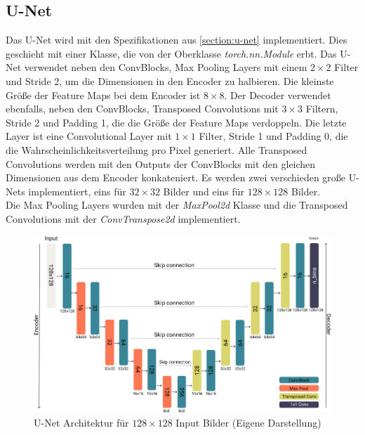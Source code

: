 \subsection{U-Net}
Das U-Net wird mit den Spezifikationen aus \ref{section:u-net} implementiert. Dies geschieht mit einer Klasse, die von der Oberklasse
\textit{torch.nn.Module} erbt. Das U-Net verwendet neben den ConvBlocks, Max Pooling Layers mit einem $2 \times 2$ Filter und Stride 2,
um die Dimensionen in den Encoder zu halbieren. Die kleinste Größe der Feature Maps bei dem Encoder ist $8 \times 8$.
Der Decoder verwendet ebenfalls, neben den ConvBlocks, Transposed Convolutions mit $3 \times 3$
Filtern, Stride 2 und Padding 1, die die Größe der Feature Maps verdoppeln. Die letzte Layer ist eine Convolutional Layer mit $1 \times 1$ Filter,
Stride 1 und Padding 0, die die
Wahrscheinlichkeitsverteilung pro Pixel generiert. Alle Transposed Convolutions werden mit den Outputs der ConvBlocks mit den gleichen
Dimensionen aus dem Encoder konkateniert.
Es werden zwei verschieden große U-Nets implementiert, eins für $32 \times 32$ Bilder und eins für
$128 \times 128$ Bilder.
\\
Die Max Pooling Layers wurden mit der \textit{MaxPool2d} Klasse und die Transposed Convolutions mit der \textit{ConvTranspose2d} implementiert.

\begin{figure}[H]
  \centering
  \includegraphics[width=1\textwidth]{resources/networks/128u-net.png}
  \caption{U-Net Architektur für $128 \times 128$ Input Bilder (Eigene Darstellung)}
  \label{image:128u-net}
\end{figure}